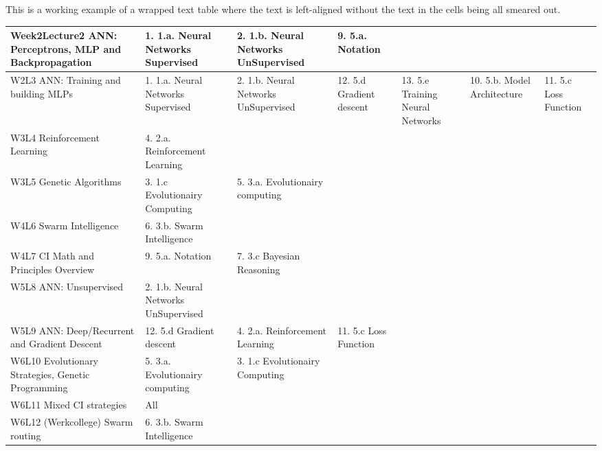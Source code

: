 %
    This is a working example of a wrapped text table where the text is left-aligned without the text in the cells being all smeared out.
    \begin{table}[H]
    \hspace*{-11.50em}
    \begin{tabular}{| L{3cm} |L{3cm}|L{2.5cm}|L{2cm}|L{2.cm}|L{2.cm}|L{2.cm}|}
    \hline
    Week2Lecture2 ANN: Perceptrons, MLP and Backpropagation &   1. 1.a. Neural Networks Supervised  &   2. 1.b. Neural Networks UnSupervised    &   9. 5.a. Notation    &       &       &       \\ \hline
    W2L3 ANN: Training and building MLPs    &   1. 1.a. Neural Networks Supervised  &   2. 1.b. Neural Networks UnSupervised    &   12. 5.d Gradient descent    &   13. 5.e Training Neural Networks    &   10. 5.b. Model Architecture &   11. 5.c Loss Function   \\ \hline
    W3L4 Reinforcement Learning &   4. 2.a. Reinforcement Learning  &       &       &       &       &       \\ \hline
    W3L5 Genetic Algorithms &   3. 1.c Evolutionairy Computing  &   5. 3.a. Evolutionairy computing &       &       &       &       \\ \hline
    W4L6 Swarm Intelligence &   6. 3.b. Swarm Intelligence  &       &       &       &       &       \\ \hline
    W4L7 CI Math and Principles Overview    &   9. 5.a. Notation    &   7. 3.c Bayesian Reasoning   &       &       &       &       \\ \hline
    W5L8 ANN: Unsupervised  &   2. 1.b. Neural Networks UnSupervised    &       &       &       &       &       \\ \hline
    W5L9 ANN: Deep/Recurrent and Gradient Descent   &   12. 5.d Gradient descent    &   4. 2.a. Reinforcement Learning  &   11. 5.c Loss Function   &       &       &       \\ \hline
    W6L10 Evolutionary Strategies, Genetic Programming  &   5. 3.a. Evolutionairy computing &   3. 1.c Evolutionairy Computing  &       &       &       &       \\ \hline
    W6L11 Mixed CI strategies   &   All &       &       &       &       &       \\ \hline
    W6L12 (Werkcollege) Swarm routing   &   6. 3.b. Swarm Intelligence  &       &       &       &       &       \\ \hline
    \end{tabular}
    \end{table}
%
% 
